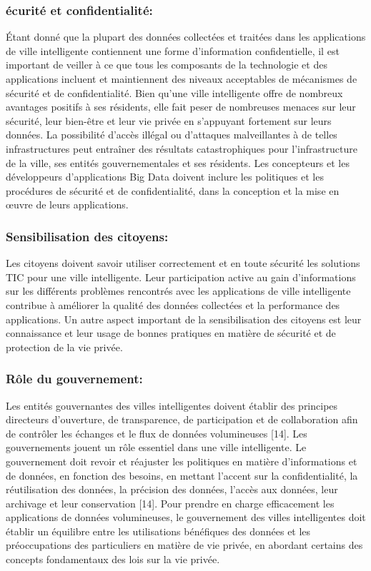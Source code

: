 \documentclass[french, a4paper, 12pt]{report}
\begin{document}
\subsubsection{écurité et confidentialité:}
Étant donné que la plupart des données collectées et traitées dans les applications de ville intelligente contiennent une forme d’information confidentielle, il est important de veiller à ce que tous les composants de la technologie et des applications incluent et maintiennent des niveaux acceptables de mécanismes de sécurité et de confidentialité. Bien qu'une ville intelligente offre de nombreux avantages positifs à ses résidents, elle fait peser de nombreuses menaces sur leur sécurité, leur bien-être et leur vie privée en s'appuyant fortement sur leurs données. La possibilité d'accès illégal ou d'attaques malveillantes à de telles infrastructures peut entraîner des résultats catastrophiques pour l'infrastructure de la ville, ses entités gouvernementales et ses résidents. Les concepteurs et les développeurs d’applications Big Data doivent inclure les politiques et les procédures de sécurité et de confidentialité, dans la conception et la mise en œuvre de leurs applications. \\
\subsubsection{Sensibilisation des citoyens:}
Les citoyens doivent savoir utiliser correctement et en toute sécurité les solutions TIC pour une ville intelligente. Leur participation active au gain d'informations sur les différents problèmes rencontrés avec les applications de ville intelligente contribue à améliorer la qualité des données collectées et la performance des applications. Un autre aspect important de la sensibilisation des citoyens est leur connaissance et leur usage de bonnes pratiques en matière de sécurité et de protection de la vie privée. \\
\subsubsection{Rôle du gouvernement:}
Les entités gouvernantes des villes intelligentes doivent établir des principes directeurs d'ouverture, de transparence, de participation et de collaboration afin de contrôler les échanges et le flux de données volumineuses [14]. Les gouvernements jouent un rôle essentiel dans une ville intelligente. Le gouvernement doit revoir et réajuster les politiques en matière d'informations et de données, en fonction des besoins, en mettant l'accent sur la confidentialité, la réutilisation des données, la précision des données, l'accès aux données, leur archivage et leur conservation [14]. 
Pour prendre en charge efficacement les applications de données volumineuses, le gouvernement des villes intelligentes doit établir un équilibre entre les utilisations bénéfiques des données et les préoccupations des particuliers en matière de vie privée, en abordant certains des concepts fondamentaux des lois sur la vie privée.\\
\end{document}

